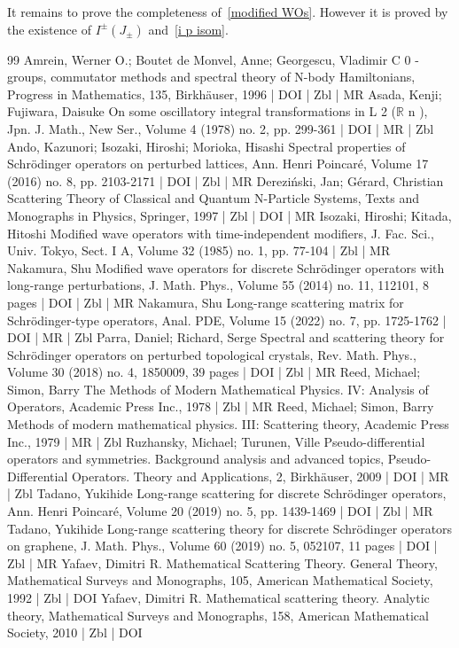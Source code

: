 \documentclass[10pt]{amsart}
\theoremstyle{definition}\newtheorem{defi}[theo]{Definition}\newtheorem{rema}[theo]{Remark}\newtheorem{exam}[theo]{Example}\newtheorem{exem}[theo]{Example}\newtheorem{nota}[theo]{Notation}
\begin{document}
It remains to prove the completeness of~\eqref{modified WOs}. However it is proved by the existence of $I^\pm(J_\pm)$ and~\eqref{i p isom}.




\begin{thebibliography}{99}
 Amrein, Werner O.; Boutet de Monvel, Anne; Georgescu, Vladimir C 0 -groups, commutator methods and spectral theory of N-body Hamiltonians, Progress in Mathematics, 135, Birkhäuser, 1996 | DOI | Zbl | MR
 Asada, Kenji; Fujiwara, Daisuke On some oscillatory integral transformations in L 2 ($\mathbb{R}$ n ), Jpn. J. Math., New Ser., Volume 4 (1978) no. 2, pp. 299-361 | DOI | MR | Zbl
 Ando, Kazunori; Isozaki, Hiroshi; Morioka, Hisashi Spectral properties of Schrödinger operators on perturbed lattices, Ann. Henri Poincaré, Volume 17 (2016) no. 8, pp. 2103-2171 | DOI | Zbl | MR
 Dereziński, Jan; Gérard, Christian Scattering Theory of Classical and Quantum N-Particle Systems, Texts and Monographs in Physics, Springer, 1997 | Zbl | DOI | MR
 Isozaki, Hiroshi; Kitada, Hitoshi Modified wave operators with time-independent modifiers, J. Fac. Sci., Univ. Tokyo, Sect. I A, Volume 32 (1985) no. 1, pp. 77-104 | Zbl | MR
 Nakamura, Shu Modified wave operators for discrete Schrödinger operators with long-range perturbations, J. Math. Phys., Volume 55 (2014) no. 11, 112101, 8 pages | DOI | Zbl | MR
 Nakamura, Shu Long-range scattering matrix for Schrödinger-type operators, Anal. PDE, Volume 15 (2022) no. 7, pp. 1725-1762 | DOI | MR | Zbl
 Parra, Daniel; Richard, Serge Spectral and scattering theory for Schrödinger operators on perturbed topological crystals, Rev. Math. Phys., Volume 30 (2018) no. 4, 1850009, 39 pages | DOI | Zbl | MR
 Reed, Michael; Simon, Barry The Methods of Modern Mathematical Physics. IV: Analysis of Operators, Academic Press Inc., 1978 | Zbl | MR
 Reed, Michael; Simon, Barry Methods of modern mathematical physics. III: Scattering theory, Academic Press Inc., 1979 | MR | Zbl
 Ruzhansky, Michael; Turunen, Ville Pseudo-differential operators and symmetries. Background analysis and advanced topics, Pseudo-Differential Operators. Theory and Applications, 2, Birkhäuser, 2009 | DOI | MR | Zbl
 Tadano, Yukihide Long-range scattering for discrete Schrödinger operators, Ann. Henri Poincaré, Volume 20 (2019) no. 5, pp. 1439-1469 | DOI | Zbl | MR
 Tadano, Yukihide Long-range scattering theory for discrete Schrödinger operators on graphene, J. Math. Phys., Volume 60 (2019) no. 5, 052107, 11 pages | DOI | Zbl | MR
 Yafaev, Dimitri R. Mathematical Scattering Theory. General Theory, Mathematical Surveys and Monographs, 105, American Mathematical Society, 1992 | Zbl | DOI
 Yafaev, Dimitri R. Mathematical scattering theory. Analytic theory, Mathematical Surveys and Monographs, 158, American Mathematical Society, 2010 | Zbl | DOI
\end{thebibliography}
\end{document}

